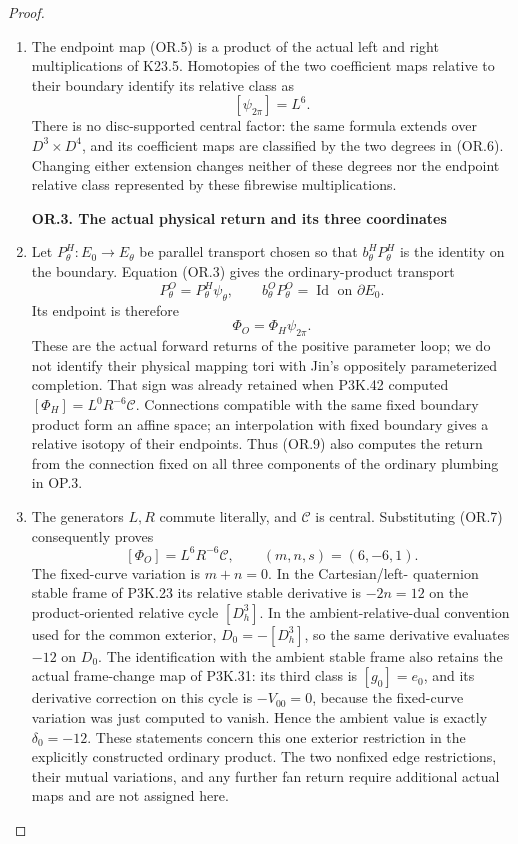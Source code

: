 \begin{proof}
\begin{enumerate}[label=\arabic*.]
\item The endpoint map (OR.5) is a product of the actual left and right
multiplications of K23.5. Homotopies of the two coefficient maps
relative to their boundary identify its relative class as
\[
                         [\psi_{2\pi}]=L^6.           \tag{OR.7}
\]
There is no disc-supported central factor: the same formula extends
over \(D^3\times D^4\), and its coefficient maps are classified by
the two degrees in (OR.6). Changing either extension changes neither
of these degrees nor the endpoint relative class represented by
these fibrewise multiplications.

\par

\medskip\noindent\textbf{OR.3. The actual physical return and its three coordinates}

\par\nobreak

\item Let \(P^H_\theta:E_0\to E_\theta\) be parallel transport chosen
so that \(b^H_\theta P^H_\theta\) is the identity on the boundary.
Equation (OR.3) gives the ordinary-product transport
\[
                       P^O_\theta=P^H_\theta\psi_\theta,
 \qquad b^O_\theta P^O_\theta=\operatorname{Id}
                       \text{ on }\partial E_0.      \tag{OR.8}
\]
Its endpoint is therefore
\[
                         \Phi_O=\Phi_H\psi_{2\pi}.   \tag{OR.9}
\]
These are the actual forward returns of the positive parameter loop;
we do not identify their physical mapping tori with Jin's oppositely
parameterized completion. That sign was already retained when
P3K.42 computed \([\Phi_H]=L^0R^{-6}\mathcal C\).
Connections compatible with the same fixed boundary product form
an affine space; an interpolation with fixed boundary gives a
relative isotopy of their endpoints. Thus (OR.9) also computes the
return from the connection fixed on all three components of the
ordinary plumbing in OP.3.

\item The generators \(L,R\) commute literally, and \(\mathcal C\) is
central. Substituting (OR.7) consequently proves
\[
       [\Phi_O]=L^6R^{-6}\mathcal C,
       \qquad (m,n,s)=(6,-6,1).                      \tag{OR.10}
\]
The fixed-curve variation is \(m+n=0\). In the Cartesian/left-
quaternion stable frame of P3K.23 its relative stable derivative is
\(-2n=12\) on the product-oriented relative cycle \([D^3_h]\).
In the ambient-relative-dual convention used for the common exterior,
\(D_0=-[D^3_h]\), so the same derivative evaluates \(-12\) on
\(D_0\). The identification with the ambient stable frame also retains the
actual frame-change map of P3K.31: its third class is
\([g_0]=e_0\), and its derivative correction on this cycle is
\(-V_{00}=0\), because the fixed-curve variation was just
computed to vanish. Hence the ambient value is exactly
\(\delta_0=-12\). These statements concern this one exterior restriction
in the explicitly constructed ordinary product. The two nonfixed
edge restrictions, their mutual variations, and any further fan
return require additional actual maps and are not assigned here.


\end{enumerate}
\end{proof}
